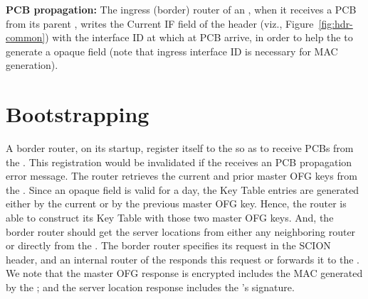 {\bf PCB propagation: } The ingress (border) router of an \AD, when
it receives a PCB from its parent \AD, writes the Current IF field of
the header (viz., Figure~\ref{fig:hdr-common}) with the interface ID
at which at PCB arrive, in order to help the \BS to generate a opaque
field (note that ingress interface ID is necessary for MAC
generation).
 
\section{Bootstrapping}
A border router, on its startup, register itself to the \BS so as to
receive PCBs from the \BS. This registration would be invalidated if
the \BS receives an PCB propagation error message.  The router retrieves the current and prior master
OFG keys from the \CS. Since an opaque field is valid for a day, the
Key Table entries are generated either by the current or by the
previous master OFG key. Hence, the router is able to construct its
Key Table with those two master OFG keys. And, the border router
should get the server locations from either any neighboring router or
directly from the \CS. The border router specifies its request in the
SCION header, and an internal router of the \AD responds this request
or forwards it to the \CS. We note that the master OFG response is
encrypted includes the MAC generated by the \CS; and the server
location response includes the \CS's signature.
